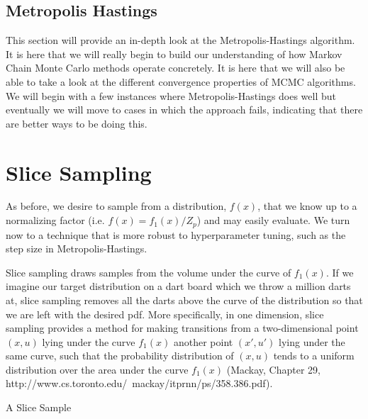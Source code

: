 \documentclass[11pt, a4paper]{article}
\makeatletter
\def\BState{\State\hskip-\ALG@thistlm}
\theoremstyle{plain}
\theoremstyle{definition}
\makeatother
\begin{document}
\subsection{Metropolis Hastings}
This section will provide an in-depth look at the Metropolis-Hastings
algorithm. It is here that we will really begin to build our understanding of
how Markov Chain Monte Carlo methods operate concretely. It is here that we
will also be able to take a look at the different convergence properties of 
MCMC algorithms. We will begin with a few instances where Metropolis-Hastings does
well but eventually we will move to cases in which the approach fails, indicating that
there are better ways to be doing this.

\section{Slice Sampling}
As before, we desire to sample from a distribution, $f(x)$, that we know
up to a normalizing factor (i.e. $f(x) = f_1(x)/Z_p$) and may easily evaluate.
We turn now to a technique that is more robust to hyperparameter tuning, such
as the step size in Metropolis-Hastings.

Slice sampling draws samples from the volume 
under the curve of $f_1(x)$. If we imagine our target
distribution on a dart board which we throw a million darts at,
slice sampling removes all the darts above the curve of the distribution
so that we are left with the desired pdf.
More specifically, in one dimension, slice sampling provides a method for making transitions
from a two-dimensional point $(x, u)$ lying under 
the curve $f_1(x)$ another point $(x', u')$ lying under the same curve,
such that the probability distribution of $(x, u)$ tends to a uniform distribution
over the area under the curve $f_1(x)$ (Mackay, Chapter 29, 
http://www.cs.toronto.edu/~mackay/itprnn/ps/358.386.pdf).
\begin{algorithm}
\caption{A Slice Sample}\label{euclid}
\end{algorithm}
\end{document}
